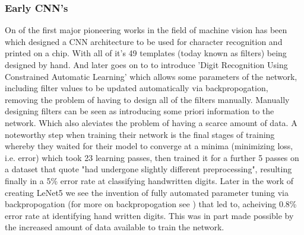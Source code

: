   \subsubsection{Early CNN's}
    On of the first major pioneering works in the field of machine vision has been \cite{Cun1989} which designed a CNN architecture to be used for character recognition and printed on a chip. With all of it's 49 templates (today known as filters) being designed by hand. And later goes on to to introduce 'Digit Recognition Using Constrained Automatic Learning' which allows some parameters of the network, including filter values to be updated automatically via backpropogation, removing the problem of having to design all of the filters manually. Manually designing filters can be seen as introducing some priori information to the network. Which also aleviates the problem of having a scarce amount of data. A noteworthy step when training their network is the final stages of training whereby they waited for their model to converge at a minima (minimizing loss, i.e. error) which took 23 learning passes, then trained it for a further 5 passes on a dataset that quote "had undergone slightly different preprocessing", resulting finally in a 5\% error rate at classifying handwritten digits. Later in the work of creating LeNet5 \cite{LeCun1998} we see the invention of fully automated parameter tuning via backpropogation (for more on backpropogation see \cite{CunYannle1988}) that led to, acheiving 0.8\% error rate at identifying hand written digits. This was in part made possible by the increased amount of data available to train the network.
    \par

